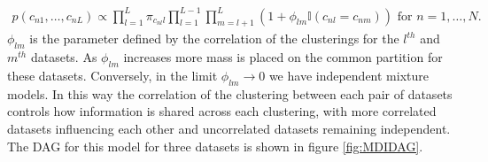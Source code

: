 \documentclass[]{article}
\begin{document}
\begin{align}
	p(c_{n1}, \ldots, c_{nL}) \propto \prod_{l=1}^L \pi_{c_{nl}l}\prod_{l=1}^{L-1}\prod_{m=l+1}^L(1 + \phi_{lm} \mathbb{I}(c_{nl} = c_{nm})) \textrm{ for $n = 1,\ldots,N$.}
	\label{eqn:mdiPrior}
\end{align}
$\phi_{lm}$ is the parameter defined by the correlation of the clusterings for the $l^{th}$ and $m^{th}$ datasets. As $\phi_{lm}$ increases more mass is placed on the common partition for these datasets. Conversely, in the limit $\phi_{lm}\to 0$ we have independent mixture models. In this way the correlation of the clustering between each pair of datasets controls how information is shared across each clustering, with more correlated datasets influencing each other and uncorrelated datasets remaining independent. The DAG for this model for three datasets is shown in figure \ref{fig:MDIDAG}.
\end{document}

